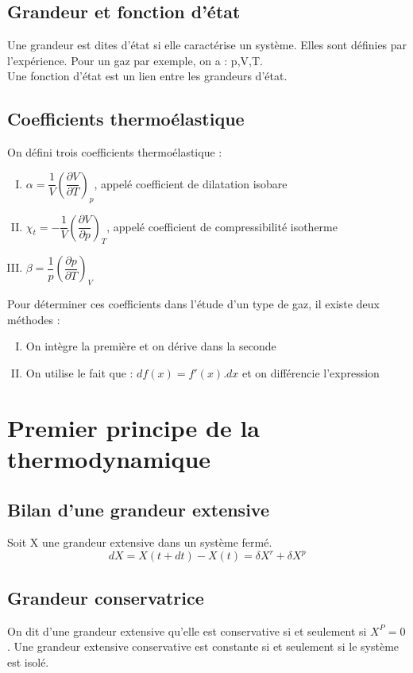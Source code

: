 \section{Grandeur et fonction d'état}
\begin{de}
 Une grandeur est dites d'état si elle caractérise un système. Elles sont définies par l'expérience. Pour un gaz par exemple, on a : p,V,T.\\
 Une fonction d'état est un lien entre les grandeurs d'état.
\end{de}
\section{Coefficients thermoélastique}
\begin{de}
 On défini trois coefficients thermoélastique :
 \begin{enumerate}[I) ]
 \item $\alpha = \dfrac{1}{V}(\dfrac{\partial V}{\partial T})_p$, appelé coefficient de dilatation isobare
 \item $\chi_t = -\dfrac{1}{V}(\dfrac{\partial V}{\partial p})_T$, appelé coefficient de compressibilité isotherme
 \item $\beta = \dfrac{1}{p}(\dfrac{\partial p}{\partial T})_V$ 
\end{enumerate}
\end{de}
Pour déterminer ces coefficients dans l'étude d'un type de gaz, il existe deux méthodes : 
\begin{enumerate}[I) ]
 \item On intègre la première et on dérive dans la seconde
 \item On utilise le fait que : $df(x) = f'(x).dx$ et on différencie l'expression
\end{enumerate}
\chapter{Premier principe de la thermodynamique}
\section{Bilan d'une grandeur extensive}
\begin{de}
Soit X une grandeur extensive dans un système fermé.
$$dX = X(t+dt)-X(t)=\delta X^{r}+\delta X^{p}$$
\end{de}
\section{Grandeur conservatrice}
\begin{de}
 On dit d'une grandeur extensive qu'elle est conservative si et seulement si $X^{P}=0$.
Une grandeur extensive conservative est constante si et seulement si le système est isolé.
\end{de}
